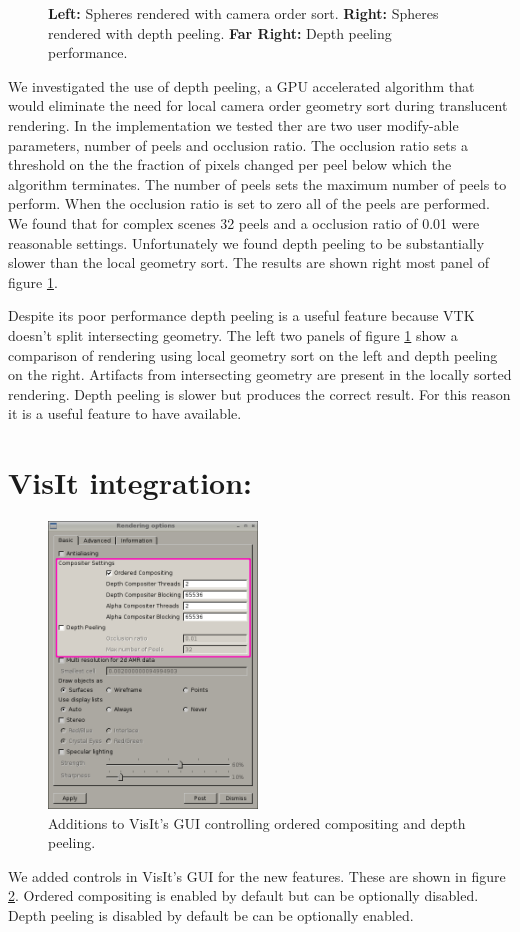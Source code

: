 \documentclass[a4paper,10pt]{report}
\begin{document}
\begin{figure}
\begin{minipage}{0.3\textwidth}
\begin{center}
\end{center}
\end{minipage}
\caption{\footnotesize {\bf Left:} Spheres rendered with camera order sort. {\bf Right:} Spheres rendered with depth peeling. {\bf Far Right:} Depth peeling performance.}
\label{fig:depth_peel}
\end{figure}
We investigated the use of depth peeling, a GPU accelerated algorithm that would eliminate the need for local camera order geometry sort during translucent rendering. In the implementation we tested ther are two user modify-able parameters, number of peels and occlusion ratio. The occlusion ratio sets a threshold on the the fraction of pixels changed per peel below which the algorithm terminates. The number of peels sets the maximum number of peels to perform. When the occlusion ratio is set to zero all of the peels are performed. We found that for complex scenes 32 peels and a occlusion ratio of 0.01 were reasonable settings.  Unfortunately we found depth peeling to be substantially slower than the local geometry sort. The results are shown right most panel of figure \ref{fig:depth_peel}. 

Despite its poor performance depth peeling is a useful feature because VTK doesn't split intersecting geometry. The left two panels of figure \ref{fig:depth_peel} show a comparison of rendering using local geometry sort on the left and depth peeling on the right. Artifacts from intersecting geometry are present in the locally sorted rendering. Depth peeling is slower but produces the correct result. For this reason it is a useful feature to have available.

\section{VisIt integration:}
\begin{figure}
 \centering
 \includegraphics[height=3in]{./settings_window.png}
 \caption{Additions to VisIt's GUI controlling ordered compositing and depth peeling.}
 \label{fig:settings}
\end{figure}
We added controls in VisIt's GUI for the new features. These are shown in figure \ref{fig:settings}. Ordered compositing is enabled by default but can be optionally  disabled. Depth peeling is disabled by default be can be optionally enabled.
\end{document}

